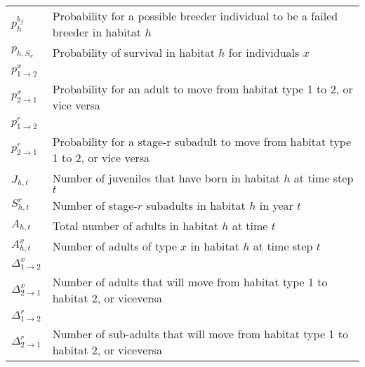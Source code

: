 \begin{table}
\begin{tabular}[b]{@{}p{1.5cm}p{13cm}@{}}
${p}_{h}^{b_{f}}$ & Probability for a possible breeder individual to be a failed breeder in habitat $h$                                                                                                                           \\
${p}_{h,S_{x}}$   & Probability of survival in habitat $h$ for individuals $x$                                                                                                                                                    \\
\noalign{\bigskip}
${p}_{1\rightarrow2}^{x}$ \\ ${p}_{2\rightarrow1}^{x}$ & Probability for an adult to move from habitat type 1 to 2, or vice versa                                                                                                 \\
\noalign{\bigskip}
${p}_{1\rightarrow2}^{r}$ \\ ${p}_{2\rightarrow1}^{r}$ & Probability for a stage-r subadult to move from habitat type 1 to 2, or vice versa                                                                                       \\
\noalign{\smallskip}
${J}_{h,t}$       & Number of juveniles that have born in habitat $h$ at time step $t$                                                                                                                                            \\
${S}_{h,t}^{r}$   & Number of stage-$r$ subadults in habitat $h$ in year $t$                                                                                                                                                      \\
${A}_{h,t}$       & Total number of adults in habitat $h$ at time $t$                                                                                                                                                             \\
${A}_{h,t}^{x}$   & Number of adults of type $x$ in habitat $h$ at time step $t$                                                                                                                                                  \\
\noalign{\bigskip}
${\Delta}_{1\rightarrow2}^{x}$ \\ ${\Delta}_{2\rightarrow1}^{x}$   & Number of adults that will move from habitat type 1 to habitat 2, or viceversa                                                                               \\
\noalign{\smallskip}
${\Delta}_{1\rightarrow2}^{r}$ \\ ${\Delta}_{2\rightarrow1}^{r}$   & Number of sub-adults that will move from habitat type 1 to habitat 2, or viceversa                                                                           \\ \bottomrule
\end{tabular}
\end{table}

